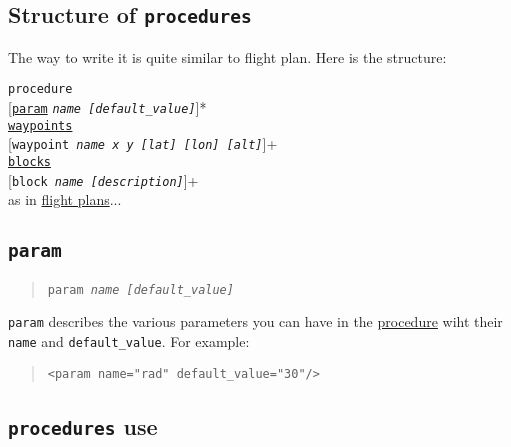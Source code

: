 \documentclass{article}
\renewcommand{\tt}[1]{\texttt{#1}}
\newcommand{\ex}[1]{\colorbox[gray]{0.92}{\tt{#1}}}
\newcommand{\hs}[1]{\hspace*{#1cm}}
\newcommand{\qt}[1]{\textcolor{gris75}{#1}}
\begin{document}
\hypertarget{procedurestructure}{\subsection{Structure of \tt{procedures}}}
The way to write it is quite similar to flight plan. Here is the structure: \\

\begin{minipage}[ctb]{\textwidth}
\tt{procedure} \\
	\hs{0.5} [\hyperlink{param}{\tt{param}} \tt{\emph{name [default\_value]}}]* \\
		
	\hs{0.5} \hyperlink{waypoints}{\tt{waypoints}} \\
		\hs{1} [\tt{waypoint \emph{name x y [lat] [lon] [alt]}}]+ \\
		
	\hs{0.5} \hyperlink{blocks}{\tt{blocks}} \\
		\hs{1} [\tt{block \emph{name [description]}}]+ \\
			\hs{1.5} as in \hyperlink{flightplanstructure}{flight plans}... \\
\end{minipage}


\hypertarget{param}{\subsection{\tt{param}}}
\begin{quote}
	\tt{param \emph{name [default\_value]}}
\end{quote}

\tt{param} describes the various parameters you can have in the
\hyperlink{procedure}{procedure} wiht their \tt{name} and \tt{default\_value}. For example: \\
\begin{quote}
	\ex{<param name="\qt{rad}" default\_value="\qt{30}"/>}
\end{quote}


\hypertarget{procedureuse}{\subsection{\tt{procedures} use}}
\label{procedureuse2}
\end{document}

